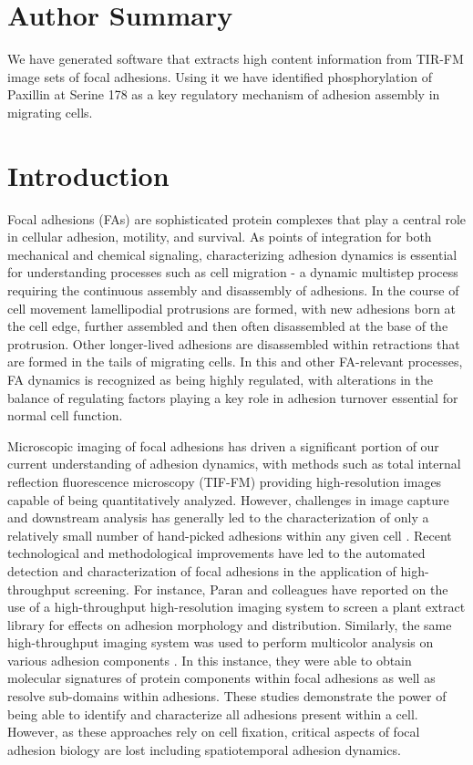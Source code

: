\documentclass[10pt]{article}
\begin{document}

\section*{Author Summary}

We have generated software that extracts high content information from TIR-FM
image sets of focal adhesions.  Using it we have identified phosphorylation of
Paxillin at Serine 178 as a key regulatory mechanism of adhesion assembly in
migrating cells.

\section*{Introduction}

Focal adhesions (FAs) are sophisticated protein complexes that play a central
role in cellular adhesion, motility, and survival. As points of integration for
both mechanical and chemical signaling, characterizing adhesion dynamics is
essential for understanding processes such as cell migration - a dynamic
multistep process requiring the continuous assembly and disassembly of
adhesions. In the course of cell movement lamellipodial protrusions are formed,
with new adhesions born at the cell edge, further assembled and then often
disassembled at the base of the protrusion. Other longer-lived adhesions are
disassembled within retractions that are formed in the tails of migrating cells.
In this and other FA-relevant processes, FA dynamics is recognized as being
highly regulated, with alterations in the balance of regulating factors playing
a key role in adhesion turnover essential for normal cell function.

Microscopic imaging of focal adhesions has driven a significant portion of our
current understanding of adhesion dynamics, with methods such as total internal
reflection fluorescence microscopy (TIF-FM) providing high-resolution images
capable of being quantitatively analyzed. However, challenges in image capture
and downstream analysis has generally led to the characterization of only a
relatively small number of hand-picked adhesions within any given cell
\cite{Webb2004}. Recent technological and methodological improvements have led
to the automated detection and characterization of focal adhesions in the
application of high-throughput screening. For instance, Paran and colleagues
have reported on the use of a high-throughput high-resolution imaging system to
screen a plant extract library for effects on adhesion morphology and
distribution. Similarly, the same high-throughput imaging system was used to
perform multicolor analysis on various adhesion components \cite{Zamir2008}. In
this instance, they were able to obtain molecular signatures of protein
components within focal adhesions as well as resolve sub-domains within
adhesions. These studies demonstrate the power of being able to identify and
characterize all adhesions present within a cell. However, as these approaches
rely on cell fixation, critical aspects of focal adhesion biology are lost
including spatiotemporal adhesion dynamics.
\end{document}
